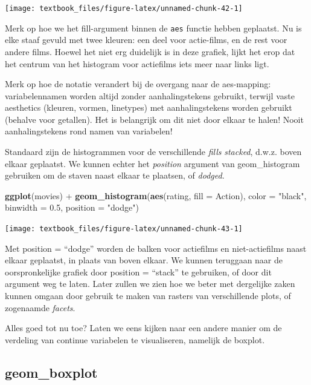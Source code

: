 \documentclass[]{tufte-book}
\newenvironment{Shaded}{}{}
\newcommand{\DataTypeTok}[1]{\textcolor[rgb]{0.56,0.13,0.00}{#1}}
\newcommand{\FloatTok}[1]{\textcolor[rgb]{0.25,0.63,0.44}{#1}}
\newcommand{\KeywordTok}[1]{\textcolor[rgb]{0.00,0.44,0.13}{\textbf{#1}}}
\newcommand{\NormalTok}[1]{#1}
\newcommand{\OperatorTok}[1]{\textcolor[rgb]{0.40,0.40,0.40}{#1}}
\newcommand{\StringTok}[1]{\textcolor[rgb]{0.25,0.44,0.63}{#1}}
\begin{document}
\texttt{[image: textbook\_files/figure-latex/unnamed-chunk-42-1]}

Merk op hoe we het fill-argument binnen de \texttt{aes} functie hebben geplaatst. Nu is elke staaf gevuld met twee kleuren: een deel voor actie-films, en de rest voor andere films. Hoewel het niet erg duidelijk is in deze grafiek, lijkt het erop dat het centrum van het histogram voor actiefilms iets meer naar links ligt.

Merk op hoe de notatie verandert bij de overgang naar de aes-mapping: variabelennamen worden altijd zonder aanhalingstekens gebruikt, terwijl vaste aesthetics (kleuren, vormen, linetypes) met aanhalingstekens worden gebruikt (behalve voor getallen). Het is belangrijk om dit niet door elkaar te halen! Nooit aanhalingstekens rond namen van variabelen!

Standaard zijn de histogrammen voor de verschillende \emph{fills} \emph{stacked}, d.w.z. boven elkaar geplaatst. We kunnen echter het \emph{position} argument van geom\_histogram gebruiken om de staven naast elkaar te plaatsen, of \emph{dodged}.

\begin{Shaded}
\begin{Highlighting}[]
\KeywordTok{ggplot}\NormalTok{(movies) }\OperatorTok{+}
\StringTok{    }\KeywordTok{geom_histogram}\NormalTok{(}\KeywordTok{aes}\NormalTok{(rating, }\DataTypeTok{fill =}\NormalTok{ Action), }
                   \DataTypeTok{color =} \StringTok{"black"}\NormalTok{, }\DataTypeTok{binwidth =} \FloatTok{0.5}\NormalTok{, }\DataTypeTok{position =} \StringTok{"dodge"}\NormalTok{)}
\end{Highlighting}
\end{Shaded}

\texttt{[image: textbook\_files/figure-latex/unnamed-chunk-43-1]}

Met position = ``dodge'' worden de balken voor actiefilms en niet-actiefilms naast elkaar geplaatst, in plaats van boven elkaar. We kunnen teruggaan naar de oorspronkelijke grafiek door position = ``stack'' te gebruiken, of door dit argument weg te laten. Later zullen we zien hoe we beter met dergelijke zaken kunnen omgaan door gebruik te maken van rasters van verschillende plots, of zogenaamde \emph{facets}.

Alles goed tot nu toe? Laten we eens kijken naar een andere manier om de verdeling van continue variabelen te visualiseren, namelijk de boxplot.

\hypertarget{geom_boxplot}{%
\subsection{geom\_boxplot}\label{geom_boxplot}}
\end{document}
